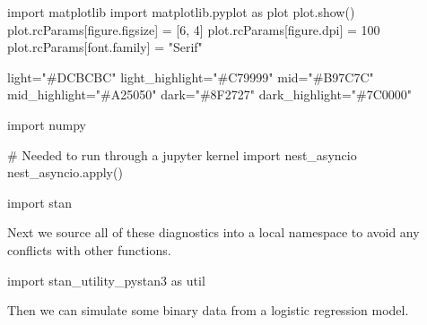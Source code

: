 \documentclass[
  letterpaper,
  DIV=11,
  numbers=noendperiod]{scrartcl}
\newenvironment{Shaded}{\begin{snugshade}}{\end{snugshade}}
\newcommand{\BuiltInTok}[1]{\textcolor[rgb]{0.00,0.23,0.31}{#1}}
\newcommand{\CommentTok}[1]{\textcolor[rgb]{0.37,0.37,0.37}{#1}}
\newcommand{\DecValTok}[1]{\textcolor[rgb]{0.68,0.00,0.00}{#1}}
\newcommand{\ImportTok}[1]{\textcolor[rgb]{0.00,0.46,0.62}{#1}}
\newcommand{\NormalTok}[1]{\textcolor[rgb]{0.00,0.23,0.31}{#1}}
\newcommand{\OperatorTok}[1]{\textcolor[rgb]{0.37,0.37,0.37}{#1}}
\newcommand{\StringTok}[1]{\textcolor[rgb]{0.13,0.47,0.30}{#1}}
\begin{document}
\begin{Shaded}
\begin{Highlighting}[]
\ImportTok{import}\NormalTok{ matplotlib}
\ImportTok{import}\NormalTok{ matplotlib.pyplot }\ImportTok{as}\NormalTok{ plot}
\NormalTok{plot.show()}
\NormalTok{plot.rcParams[}\StringTok{\textquotesingle{}figure.figsize\textquotesingle{}}\NormalTok{] }\OperatorTok{=}\NormalTok{ [}\DecValTok{6}\NormalTok{, }\DecValTok{4}\NormalTok{]}
\NormalTok{plot.rcParams[}\StringTok{\textquotesingle{}figure.dpi\textquotesingle{}}\NormalTok{] }\OperatorTok{=} \DecValTok{100}
\NormalTok{plot.rcParams[}\StringTok{\textquotesingle{}font.family\textquotesingle{}}\NormalTok{] }\OperatorTok{=} \StringTok{"Serif"}

\NormalTok{light}\OperatorTok{=}\StringTok{"\#DCBCBC"}
\NormalTok{light\_highlight}\OperatorTok{=}\StringTok{"\#C79999"}
\NormalTok{mid}\OperatorTok{=}\StringTok{"\#B97C7C"}
\NormalTok{mid\_highlight}\OperatorTok{=}\StringTok{"\#A25050"}
\NormalTok{dark}\OperatorTok{=}\StringTok{"\#8F2727"}
\NormalTok{dark\_highlight}\OperatorTok{=}\StringTok{"\#7C0000"}

\ImportTok{import}\NormalTok{ numpy}

\CommentTok{\# Needed to run through a jupyter kernel}
\ImportTok{import}\NormalTok{ nest\_asyncio}
\NormalTok{nest\_asyncio.}\BuiltInTok{apply}\NormalTok{()}

\ImportTok{import}\NormalTok{ stan}
\end{Highlighting}
\end{Shaded}

Next we source all of these diagnostics into a local namespace to avoid
any conflicts with other functions.

\begin{Shaded}
\begin{Highlighting}[]
\ImportTok{import}\NormalTok{ stan\_utility\_pystan3 }\ImportTok{as}\NormalTok{ util}
\end{Highlighting}
\end{Shaded}

Then we can simulate some binary data from a logistic regression model.
\end{document}
